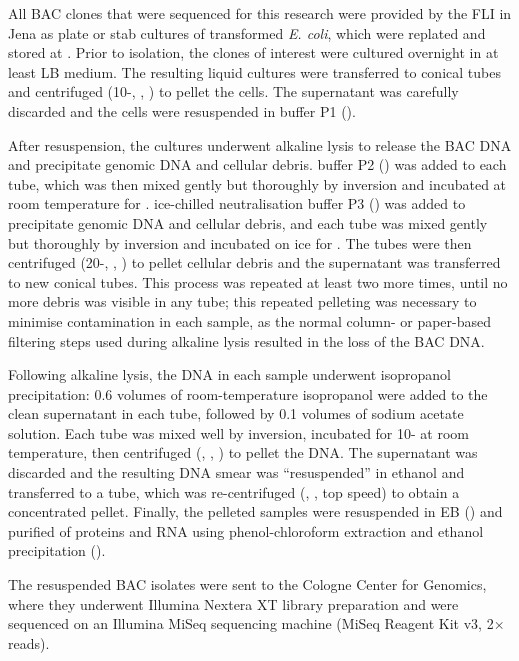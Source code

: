 All BAC clones that were sequenced for this research were provided by the FLI in Jena as plate or stab cultures of transformed \textit{E. coli}, which were replated and stored at . Prior to isolation, the clones of interest were cultured overnight in at least  LB medium. The resulting liquid cultures were transferred to  conical tubes and centrifuged (10-, , ) to pellet the cells. The supernatant was carefully discarded and the cells were resuspended in  buffer P1 ().

After resuspension, the cultures underwent alkaline lysis \parencite{birnboim1979alkalinelysis} to release the BAC DNA and precipitate genomic DNA and cellular debris.  buffer P2 () was added to each tube, which was then mixed gently but thoroughly by inversion and incubated at room temperature for .  ice-chilled neutralisation buffer P3 () was added to precipitate genomic DNA and cellular debris, and each tube was mixed gently but thoroughly by inversion and incubated on ice for . The tubes were then centrifuged (20-, , ) to pellet cellular debris and the supernatant was transferred to new conical tubes. This process was repeated at least two more times, until no more debris was visible in any tube; this repeated pelleting was necessary to minimise contamination in each sample, as the normal column- or paper-based filtering steps used during alkaline lysis resulted in the loss of the BAC DNA.

Following alkaline lysis, the DNA in each sample underwent isopropanol precipitation: 0.6 volumes of room-temperature isopropanol were added to the clean supernatant in each tube, followed by 0.1 volumes of  sodium acetate solution. Each tube was mixed well by inversion, incubated for 10- at room temperature, then centrifuged (, , ) to pellet the DNA. The supernatant was discarded and the resulting DNA smear was ``resuspended'' in   ethanol and transferred to a  tube, which was re-centrifuged (, , top speed) to obtain a concentrated pellet. Finally, the pelleted samples were resuspended in EB () and purified of proteins and RNA using phenol-chloroform extraction and ethanol precipitation ().

The resuspended BAC isolates were sent to the Cologne Center for Genomics, where they underwent Illumina Nextera XT library preparation and were sequenced on an Illumina MiSeq sequencing machine (MiSeq Reagent Kit v3, 2$\times$ reads).

